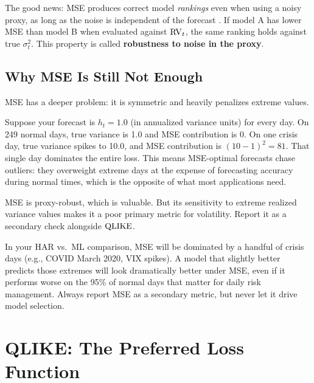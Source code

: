 The good news: MSE produces correct model \emph{rankings} even when using a noisy proxy, as long as the noise is independent of the forecast \citep{Patton2011}.
If model A has lower MSE than model B when evaluated against $\operatorname{RV}_t$, the same ranking holds against true $\sigma^2_t$.
This property is called \textbf{robustness to noise in the proxy}.

\subsection{Why MSE Is Still Not Enough}

MSE has a deeper problem: it is symmetric and heavily penalizes extreme values.

\begin{intuition}
Suppose your forecast is $h_t = 1.0$ (in annualized variance units) for every day.
On 249 normal days, true variance is 1.0 and MSE contribution is 0.
On one crisis day, true variance spikes to 10.0, and MSE contribution is $(10 - 1)^2 = 81$.
That single day dominates the entire loss.
This means MSE-optimal forecasts chase outliers: they overweight extreme days at the expense of forecasting accuracy during normal times, which is the opposite of what most applications need.
\end{intuition}

\begin{keyidea}
MSE is proxy-robust, which is valuable.
But its sensitivity to extreme realized variance values makes it a poor primary metric for volatility.
Report it as a secondary check alongside $\operatorname{QLIKE}$.
\end{keyidea}

\begin{projectconnection}
In your HAR vs.\ ML comparison, MSE will be dominated by a handful of crisis days (e.g., COVID March 2020, VIX spikes).
A model that slightly better predicts those extremes will look dramatically better under MSE, even if it performs worse on the 95\% of normal days that matter for daily risk management.
Always report MSE as a secondary metric, but never let it drive model selection.
\end{projectconnection}


\section{QLIKE: The Preferred Loss Function}
\label{sec:eval-qlike}

